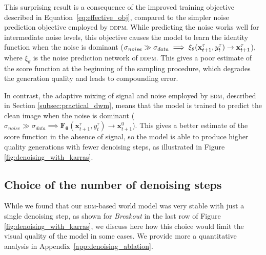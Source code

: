 This surprising result is a consequence of the improved training objective described in Equation~\ref{eq:effective_obj}, compared to the simpler noise prediction objective employed by \textsc{ddpm}. While predicting the noise works well for intermediate noise levels, this objective causes the model to learn the identity function when the noise is dominant ($\sigma_{noise}\gg\sigma_{data} \implies \xi_\theta(\mathbf{x}^\tau_{t+1}, y_t^\tau)\to\mathbf{x}^\tau_{t+1}$), where $\xi_\theta$ is the noise prediction network of \textsc{ddpm}. This gives a poor estimate of the score function at the beginning of the sampling procedure, which degrades the generation quality and leads to compounding error.

In contrast, the adaptive mixing of signal and noise employed by \textsc{edm}, described in Section \ref{subsec:practical_dwm}, means that the model is trained to predict the clean image when the noise is dominant ($\sigma_{noise}\gg\sigma_{data} \implies \mathbf{F_\theta}(\mathbf{x}^\tau_{t+1},y_t^\tau)\to\mathbf{x}^0_{t+1}$). This gives a better estimate of the score function in the absence of signal, so the model is able to produce higher quality generations with fewer denoising steps, as illustrated in Figure \ref{fig:denoising_with_karras}.


\subsection{Choice of the number of denoising steps}\label{subsec:denoising_steps}

 While we found that our \textsc{edm}-based world model was very stable with just a single denoising step, as shown for \textit{Breakout} in the last row of Figure \ref{fig:denoising_with_karras}, we discuss here how this choice would limit the visual quality of the model in some cases. We provide more a quantitative analysis in Appendix~\ref{app:denoising_ablation}.

